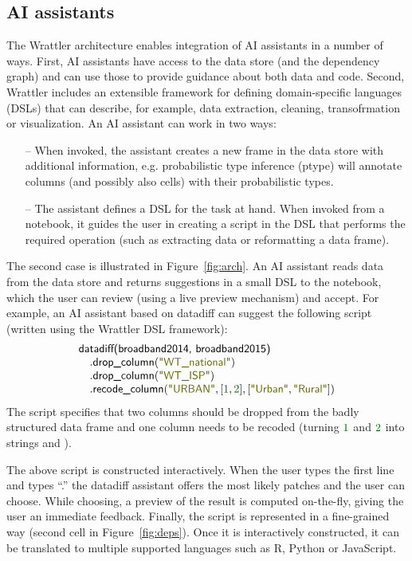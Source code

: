 \documentclass[sigplan,preprint,10pt]{acmart}\settopmatter{printfolios=true,printccs=false,printacmref=false}
\theoremstyle{plain}
\theoremstyle{definition}
\newcommand{\num}[1]{\textcolor{numclr}{#1}}
\newcommand{\str}[1]{\textnormal{\textcolor{strclr}{\sffamily "#1"}}}
\newcommand{\ident}[1]{\textnormal{\sffamily #1}}
\begin{document}
\subsection{AI assistants}

The Wrattler architecture enables integration of AI assistants in a number of ways. First, AI
assistants have access to the data store (and the dependency graph) and can use those to provide
guidance about both data and code. Second, Wrattler includes an extensible framework for defining
domain-specific languages (DSLs) that can describe, for example, data extraction, cleaning, transofrmation or 
visualization. An AI assistant can work in two ways:
%
\begin{itemize}
\item[--] When invoked, the assistant creates a new frame in the data store with additional
  information, e.g. probabilistic type inference (ptype) will annotate columns (and possibly
  also cells) with their probabilistic types.
\vspace{0.25em}
\item[--] The assistant defines a DSL for the task at hand. When invoked from a notebook,
  it guides the user in creating a script in the DSL that performs the required operation
  (such as extracting data or reformatting a data frame).
\end{itemize}
%
The second case is illustrated in Figure~\ref{fig:arch}. An AI assistant reads data from the data
store and returns suggestions in a small DSL to the notebook, which the user can review 
(using a live preview mechanism) and accept. For example, an AI
assistant based on datadiff can suggest the following script (written using the Wrattler DSL
framework):
%
\begin{equation*}
\begin{array}{l}
\ident{datadiff(broadband2014, broadband2015)}\\
\quad.\ident{drop\_column}(\str{WT\_national})\\
\quad.\ident{drop\_column}(\str{WT\_ISP})\\
\quad.\ident{recode\_column}(\str{URBAN}, [\num{1}, \num{2}], [\str{Urban},\str{Rural}])
\end{array}  
\end{equation*}
%
The script specifies that two columns should be dropped from the badly structured data frame and
one column needs to be recoded (turning $\num{1}$ and $\num{2}$ into strings
 and ).

The above script is constructed interactively. When the user types the first line and types
``.'' the datadiff assistant offers the most likely patches and the user can choose. While
choosing, a preview of the result is computed on-the-fly, giving the user an immediate feedback.
Finally, the script is represented in a fine-grained way (second cell in Figure~\ref{fig:deps}).
Once it is interactively constructed, it can be translated to multiple supported languages
such as R, Python or JavaScript.
\end{document}
